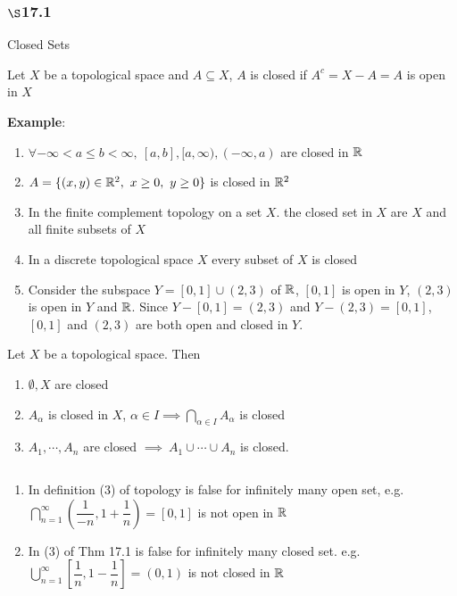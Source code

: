 \subsubsection*{$\S$17.1} Closed Sets

\begin{defn}
	Let $X$ be a topological space and $A \subseteq X$, $A$ is closed if $A^c = X-A = A$ is open in $X$
\end{defn}

\textbf{Example}:

\begin{enumerate}
	\item $\forall -\infty < a \leq b < \infty,~[a,b],[a,\infty),(-\infty,a)$ are closed in $\mathbb{R}$
	\item $A = \{(x,y) \in \mathbb{R}^2,~x\geq 0,~y \geq 0\}$ is closed in $\mathbb{R}^2$
	\item In the finite complement topology on a set $X$. the closed set in $X$ are $X$ and all finite subsets of $X$
	\item In a discrete topological space $X$ every subset of $X$ is closed
	\item Consider the subspace $Y = [0,1] \cup (2,3)$ of $\mathbb{R}$, $[0,1]$ is open in $Y$, $(2,3)$ is open in $Y$ and $\mathbb{R}$. Since $Y - [0,1] = (2,3)$ and $Y - (2,3) = [0,1]$, $[0,1]$ and $(2,3)$ are both open and closed in $Y$.
\end{enumerate}

\begin{thm*}[17.1]
	Let $X$ be a topological space. Then 
	\begin{enumerate}
		\item $\emptyset,X$ are closed
		\item $A_{\alpha}$ is closed in $X$, $\alpha \in I \implies \bigcap_{\alpha \in I}A_{\alpha}$ is closed
		\item $A_1,\cdots,A_n$ are closed $\implies ~ A_1 \cup \cdots \cup A_n$ is closed. 
	\end{enumerate}
\end{thm*}

\begin{rmk*}$ $
	\begin{enumerate}
		\item In definition (3) of topology is false for infinitely many open set, e.g. $\bigcap^{\infty}_{n = 1}\left( \dfrac{1}{-n},1 + \dfrac{1}{n} \right) = [0,1]$ is not open in $\mathbb{R}$
		\item In (3) of Thm 17.1 is false for infinitely many closed set. e.g. $\bigcup^{\infty}_{n = 1}[\dfrac{1}{n} , 1 - \dfrac{1}{n}] = (0,1)$ is not closed in $\mathbb{R}$
	\end{enumerate}
\end{rmk*}


